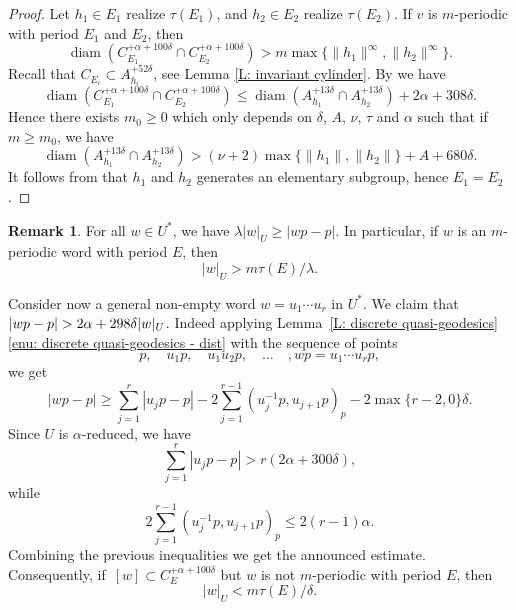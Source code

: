 \documentclass[11pt]{article}
\theoremstyle{plain}
\theoremstyle{definition}
\newtheorem{rem}[thm]{Remark}
\DeclareMathOperator{\diam}{diam}
\begin{document}
\begin{proof}
Let $h_1\in E_1$ realize $\tau(E_1)$, and $h_2\in E_2$ realize $\tau(E_2)$.
If $v$ is $m$-periodic with period $E_1$ and $E_2$, then\vspace*{-3pt}\enlargethispage{\baselineskip}%
\[
\diam \left( C_{E_1}^{+ \alpha + 100\delta} \cap C_{E_2}^{+\alpha + 100\delta}\right)
> m \max \{\| h_1 \|^\infty,\| h_2 \|^\infty\}.
\]
Recall that $C_{E_i}\subset A_{h_i}^{+52\delta}$, see Lemma \ref{L: invariant cylinder}.
By \cite[Lem.\,2.13]{coulon_geometry_2014} we have\vspace*{-3pt}
\begin{equation*}
\diam \left( C_{E_1}^{+ \alpha + 100\delta} \cap C_{E_2}^{+\alpha + 100\delta}\right)
\leq \diam \left(A_{h_1}^{+13\delta} \cap A_{h_2}^{+13\delta} \right) + 2\alpha + 308\delta.
\end{equation*}
Hence there exists $m_0 \geq 0$ which only depends on $\delta$, $A$, $\nu$, $\tau$ and $\alpha$ such that if $m \geq m_0$, we have\vspace*{-3pt}
\begin{equation*}
\diam \left(A_{h_1}^{+13\delta} \cap A_{h_2}^{+13\delta} \right)
> (\nu +2)\max\{\| h_1 \|,\| h_2 \|\} +A + 680\delta.
\end{equation*}
It follows from \cite[Prop.\,3.44]{coulon_partial_2016} that $h_1$ and $h_2$ generates an elementary subgroup, hence $E_1 = E_2$.
\end{proof}

\begin{rem}
\label{R: growth 1}
For all $w\in U^*$, we have $\lambda |w|_U \geqslant |wp-p|.$
In particular, if $w$ is an $m$-periodic word with period $E$, then\vspace*{-3pt}
\[
|w|_U > m \tau(E)/\lambda.
\]

Consider now a general non-empty word $w = u_1\cdots u_r$ in $U^*$.
We claim that $|wp-\nobreak p|> 2 \alpha + 298\delta|w|_U$.
Indeed applying Lemma~\ref{L: discrete quasi-geodesics}\eqref{enu: discrete quasi-geodesics - dist} with the sequence of points
\begin{equation*}
p, \quad u_1p, \quad u_1u_2p, \quad\dots\quad, wp = u_1\cdots u_rp,
\end{equation*}
we get\vspace*{-3pt}
\begin{equation*}
|wp -p| \geq \sum_{j = 1}^r |u_jp - p| - 2 \sum_{j = 1}^{r-1} (u_j^{-1}p,u_{j+1}p)_p - 2\max\{r-2,0\}\delta.
\end{equation*}
Since $U$ is $\alpha$-reduced, we have\vspace*{-3pt}
\begin{equation*}
\sum_{j = 1}^r |u_jp - p| > r(2\alpha + 300\delta),
\end{equation*}
while\vspace*{-3pt}
\begin{equation*}
2 \sum_{j = 1}^{r-1} (u_j^{-1}p,u_{j+1}p)_p \leq 2(r-1)\alpha.
\end{equation*}
Combining the previous inequalities we get the announced estimate.
Consequently, if~$[w] \subset C_E^{+\alpha + 100\delta}$ but $w$ is not $m$-periodic with period $E$, then
\[
|w|_U < m \tau(E)/\delta.
\]
\end{rem}
\end{document}
